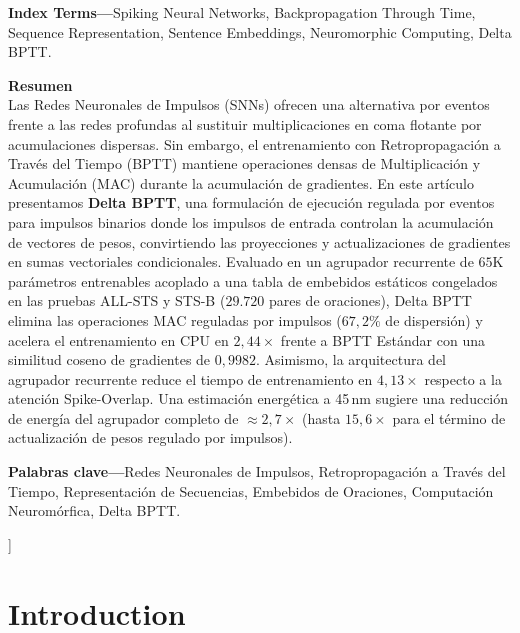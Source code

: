 \documentclass[10pt,journal,compsoc]{IEEEtran}
\begin{document}
{\begin{minipage}[t]{0.48\linewidth}
    \vspace{0.6em}
    {\fontsize{8.5pt}{10.2pt}\selectfont\textbf{Index Terms---}Spiking Neural Networks, Backpropagation Through Time, Sequence Representation, Sentence Embeddings, Neuromorphic Computing, Delta BPTT.}
  \end{minipage}%
  \hfill
  \begin{minipage}[t]{0.48\linewidth}
    {\large\bfseries Resumen}\\[0.4em]
    {\fontsize{8.5pt}{10.2pt}\selectfont Las Redes Neuronales de Impulsos (SNNs) ofrecen una alternativa por eventos frente a las redes profundas al sustituir multiplicaciones en coma flotante por acumulaciones dispersas. Sin embargo, el entrenamiento con Retropropagación a Través del Tiempo (BPTT) mantiene operaciones densas de Multiplicación y Acumulación (MAC) durante la acumulación de gradientes. En este artículo presentamos \textbf{Delta BPTT}, una formulación de ejecución regulada por eventos para impulsos binarios donde los impulsos de entrada controlan la acumulación de vectores de pesos, convirtiendo las proyecciones y actualizaciones de gradientes en sumas vectoriales condicionales. Evaluado en un agrupador recurrente de $65$K parámetros entrenables acoplado a una tabla de embebidos estáticos congelados en las pruebas ALL-STS y STS-B ($29.720$ pares de oraciones), Delta BPTT elimina las operaciones MAC reguladas por impulsos ($67{,}2\%$ de dispersión) y acelera el entrenamiento en CPU en $2{,}44\times$ frente a BPTT Estándar con una similitud coseno de gradientes de $0{,}9982$. Asimismo, la arquitectura del agrupador recurrente reduce el tiempo de entrenamiento en $4{,}13\times$ respecto a la atención Spike-Overlap. Una estimación energética a 45\,nm sugiere una reducción de energía del agrupador completo de $\approx 2,7\times$ (hasta $15{,}6\times$ para el término de actualización de pesos regulado por impulsos).}

    \vspace{0.6em}
    {\fontsize{8.5pt}{10.2pt}\selectfont\textbf{Palabras clave---}Redes Neuronales de Impulsos, Retropropagación a Través del Tiempo, Representación de Secuencias, Embebidos de Oraciones, Computación Neuromórfica, Delta BPTT.}
  \end{minipage}
  \vspace{1.0em}
}]

\section{Introduction}
\end{document}
